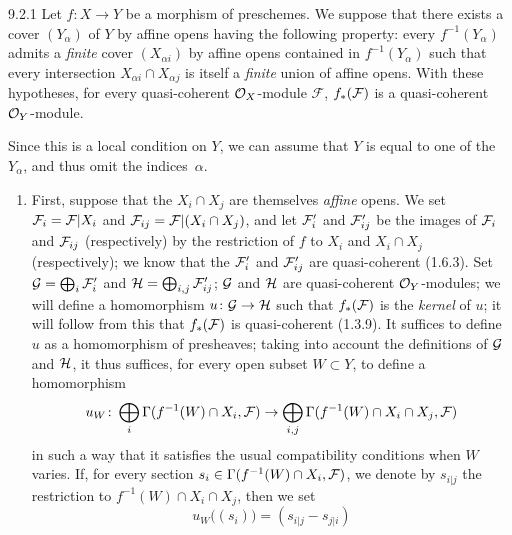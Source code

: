 \documentclass[../main.tex]{subfiles}
\begin{document}
\begin{env}[Proposition]{9.2.1}
    Let $f\colon X\to Y$ be a morphism of preschemes.
    We suppose that there exists a cover $(Y_\alpha)$ of $Y$ by affine opens having the following property: every $f^{-1}(Y_\alpha)$ admits a \emph{finite} cover $(X_{\alpha i})$ by affine opens contained in $f^{-1}(Y_\alpha)$ such that every intersection $X_{\alpha i}\cap X_{\alpha j}$ is itself a \emph{finite} union of affine opens.
    With these hypotheses, for every quasi-coherent $\mathcal{O}_X$-module $\mathscr{F}$, $f_*(\mathcal{F})$ is a quasi-coherent $\mathcal{O}_Y$-module.
\end{env}

Since this is a local condition on $Y$, we can assume that $Y$ is equal to one of the $Y_\alpha$, and thus omit the indices~$\alpha$.

\begin{enumerate}[label=\alph*)]
    \item First, suppose that the $X_i\cap X_j$ are themselves \emph{affine} opens.
        We set $\mathcal{F}_i=\mathcal{F}|X_i$ and $\mathcal{F}_{ij}=\mathcal{F}|(X_i\cap X_j)$, and let $\mathcal{F}'_i$ and $\mathcal{F}'_{ij}$ be the images of $\mathcal{F}_i$ and $\mathcal{F}_{ij}$ (respectively) by the restriction of $f$ to $X_i$ and $X_i\cap X_j$ (respectively); we know that the $\mathcal{F}'_i$ and $\mathcal{F}'_{ij}$ are quasi-coherent (1.6.3).
        Set $\mathcal{G}=\bigoplus_i\mathcal{F}'_i$ and $\mathcal{H}=\bigoplus_{i,j}\mathcal{F}'_{ij}$; $\mathcal{G}$ and $\mathcal{H}$ are quasi-coherent $\mathcal{O}_Y$-modules; we will define a homomorphism $u\colon\mathcal{G}\to\mathcal{H}$ such that $f_*(\mathcal{F})$ is the \emph{kernel} of $u$; it will follow from this that $f_*(\mathcal{F})$ is quasi-coherent (1.3.9).
        It suffices to define $u$ as a homomorphism of presheaves; taking into account the definitions of $\mathcal{G}$ and $\mathcal{H}$, it thus suffices, for every open subset $W\subset Y$, to define a homomorphism
        \begin{equation*}
            u_W\colon \bigoplus_i\Gamma(f^{-1}(W)\cap X_i, \mathcal{F}) \to \bigoplus_{i,j}\Gamma(f^{-1}(W)\cap X_i\cap X_j, \mathcal{F})
        \end{equation*}
        in such a way that it satisfies the usual compatibility conditions when $W$ varies.
        If, for every section $s_i\in\Gamma(f^{-1}(W)\cap X_i, \mathcal{F})$, we denote by $s_{i|j}$ the restriction to $f^{-1}(W)\cap X_i\cap X_j$, then we set
        \begin{equation*}
            u_W\big((s_i)\big) = (s_{i|j}-s_{j|i})

\end{equation*}
\end{enumerate}
\end{document}
